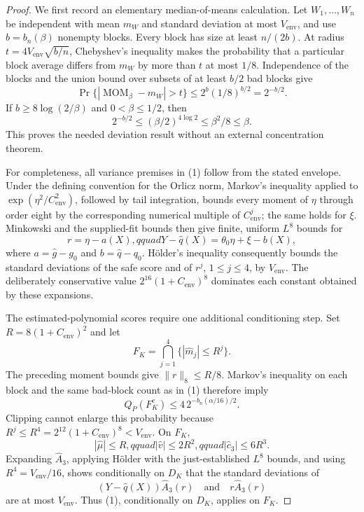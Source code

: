 \documentclass{article}
\begin{document}
\begin{proof}
We first record an elementary median-of-means calculation.  Let \(W_1,\ldots,W_n\) be independent with mean \(m_W\) and standard deviation at most \(V_{\mathrm{env}}\), and use \(b=b_n(\beta)\) nonempty blocks.  Every block has size at least \(n/(2b)\).  At radius \(t=4V_{\mathrm{env}}\sqrt{b/n}\), Chebyshev's inequality makes the probability that a particular block average differs from \(m_W\) by more than \(t\) at most \(1/8\).  Independence of the blocks and the union bound over subsets of at least \(b/2\) bad blocks give
\[
\Pr\{|\operatorname{MOM}_{\beta}-m_W|>t\}
\le 2^b(1/8)^{b/2}=2^{-b/2}.
\]
If \(b\ge8\log(2/\beta)\) and \(0<\beta\le1/2\), then
\[
2^{-b/2}\le(\beta/2)^{4\log2}\le\beta^2/8\le\beta.
\tag{1}
\]
This proves the needed deviation result without an external concentration theorem.

For completeness, all variance premises in (1) follow from the stated envelope.  Under the defining convention for the Orlicz norm, Markov's inequality applied to \(\exp(\eta^2/C_{\mathrm{env}}^2)\), followed by tail integration, bounds every moment of \(\eta\) through order eight by the corresponding numerical multiple of \(C_{\mathrm{env}}^j\); the same holds for \(\xi\).  Minkowski and the supplied-fit bounds then give finite, uniform \(L^8\) bounds for
\[
r=\eta-a(X),qquad
Y-\widehat q(X)=\theta_0\eta+\xi-b(X),
\]
where \(a=\widehat g-g_0\) and \(b=\widehat q-q_0\).  H\"older's inequality consequently bounds the standard deviations of the safe score and of \(r^j\), \(1\le j\le4\), by \(V_{\mathrm{env}}\).  The deliberately conservative value \(2^{16}(1+C_{\mathrm{env}})^8\) dominates each constant obtained by these expansions.

The estimated-polynomial scores require one additional conditioning step.  Set \(R=8(1+C_{\mathrm{env}})^2\) and let
\[
F_K=\bigcap_{j=1}^4\{|\widehat m_j|\le R^j\}.
\]
The preceding moment bounds give \(\lVert r\rVert_8\le R/8\).  Markov's inequality on each block and the same bad-block count as in (1) therefore imply
\[
Q_P(F_K^c)\le4\,2^{-b_n(\alpha/16)/2}.
\tag{2}
\]
Clipping cannot enlarge this probability because \(R^j\le R^4=2^{12}(1+C_{\mathrm{env}})^8<V_{\mathrm{env}}\).  On \(F_K\),
\[
|\widehat\mu|\le R,qquad
|\widehat v|\le2R^2,qquad
|\widehat c_3|\le6R^3.
\]
Expanding \(\widehat A_3\), applying H\"older with the just-established \(L^8\) bounds, and using \(R^4=V_{\mathrm{env}}/16\), shows conditionally on \(D_K\) that the standard deviations of
\[
(Y-\widehat q(X))\widehat A_3(r)
\quad\text{and}\quad
r\widehat A_3(r)
\]
are at most \(V_{\mathrm{env}}\).  Thus (1), conditionally on \(D_K\), applies on \(F_K\).


\end{proof}
\end{document}
